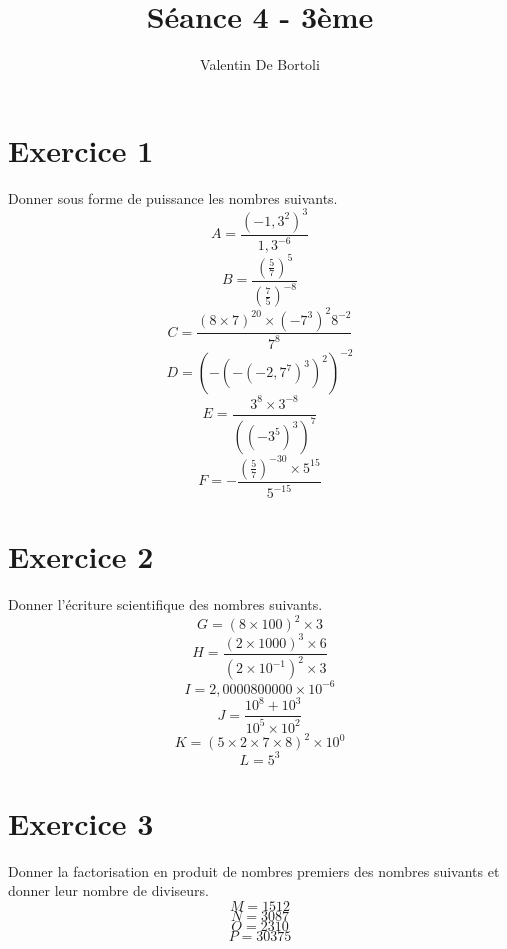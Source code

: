 \documentclass[10pt,a4paper]{article}
\title{Séance 4 - 3ème}
\author{Valentin De Bortoli}
\begin{document}
\maketitle
\section{Exercice 1}
Donner sous forme de puissance les nombres suivants.
\begin{equation}
A=\frac{(-1,3^2)^3}{1,3^{-6}}
\end{equation}
\begin{equation}
B=\frac{(\frac{5}{7})^{5}}{(\frac{7}{5})^{-8}}
\end{equation}
\begin{equation}
C=\frac{(8 \times 7)^{20}\times (-7^3)^2 8^{-2}}{7^8}
\end{equation}
\begin{equation}
D=(-(-(-2,7^7)^3)^2)^{-2}
\end{equation}
\begin{equation}
E=\frac{3^8 \times 3^{-8}}{((-3^5)^3)^7}
\end{equation}
\begin{equation}
F=-\frac{(\frac{5}{7})^{-30} \times 5^{15}}{5^{-15}}
\end{equation}
\section{Exercice 2}
Donner l'écriture scientifique des nombres suivants.
\begin{equation}
G=(8\times100)^{2}\times3
\end{equation}
\begin{equation}
H=\frac{(2 \times1000)^3 \times 6 }{(2 \times 10^{-1})^2 \times 3}
\end{equation}
\begin{equation}
I=2,0000800000 \times 10^{-6}
\end{equation}
\begin{equation}
J=\frac{10^8+10^3}{10^5 \times 10^2}
\end{equation}
\begin{equation}
K=(5 \times 2 \times 7 \times 8)^2 \times 10^0
\end{equation}
\begin{equation}
L=5^3
\end{equation}
\section{Exercice 3}
Donner la factorisation en produit de nombres premiers des nombres suivants et donner leur nombre de diviseurs.
\begin{equation}
M=1512
\end{equation}
\begin{equation}
N=3087
\end{equation}
\begin{equation}
O=2310
\end{equation}
\begin{equation}
P=30375
\end{equation}
\end{document}
